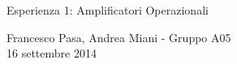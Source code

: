 \documentclass[11pt, twoside, a4paper]{article}
\begin{document}
  \begin{center}
  
    {\huge Esperienza 1: Amplificatori Operazionali}
    
    \vspace{0.1cm}
    
    {Francesco Pasa, Andrea Miani - Gruppo A05} \\
    {16 settembre 2014}
    
    \vspace{-0.2cm}
    
  \end{center}
  
  
  
  
  
\end{document}
